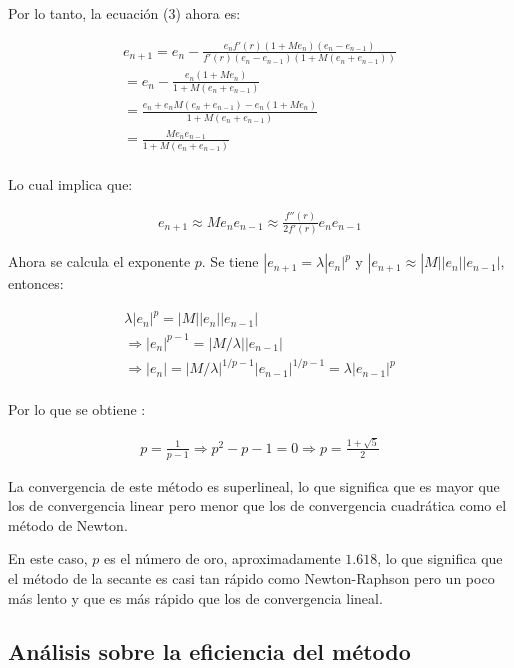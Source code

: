 Por lo tanto, la ecuación (3) ahora es:


\begin{gather*}
    e_{n+1}= e_{n} - \frac{e_nf'(r)(1+Me_n)(e_n -e_{n-1})}{f'(r)(e_n-e_{n-1})(1+M(e_n +e_{n-1}))} \\
    = e_{n} - \frac{e_n(1+Me_n)}{1+M(e_n+e_{n-1})} \\
    = \frac{e_n+e_n M(e_n+e_{n-1})-e_n(1+Me_n)}{1+M(e_n+e_{n-1})} \\
    = \frac{M e_n e_{n-1}}{1+M(e_n+e_{n-1})} \\
\end{gather*}


Lo cual implica que:

\begin{gather*}
    e_{n+1} \approx M e_n e_{n-1} \approx \frac{f''(r)}{2f'(r)} e_n e_{n-1}
\end{gather*}

Ahora se calcula el exponente $p$. Se tiene $|e_{n+1}= \lambda|e_n|^{p}$ y $|e_{n+1} \approx |M||e_n||e_{n-1}|$, entonces:

\begin{gather*}
    \lambda|e_n|^{p}=|M||e_n||e_{n-1}| \\
    \Rightarrow |e_n|^{p-1}=|M/\lambda||e_{n-1}| \\
    \Rightarrow |e_n|=|M/\lambda|^{1/{p-1}}|e_{n-1}|^{1/{p-1}}= \lambda|e_{n-1}|^{p} \\
\end{gather*} 

Por lo que se obtiene \cite{edwards}:

\begin{gather*}
    p=\frac{1}{p-1} \Rightarrow p^{2}-p-1=0 \Rightarrow p = \frac{1+ \sqrt{5}}{2}
\end{gather*} 

La convergencia de este método es superlineal, lo que significa que es mayor que los de convergencia linear pero menor que los de convergencia cuadrática como el método de Newton.

En este caso, $p$ es el número de oro, aproximadamente $1.618$, lo que significa que el método de la secante es casi tan rápido como Newton-Raphson pero un poco más lento y que es más rápido que los de convergencia lineal.

\subsection{Análisis sobre la eficiencia del método}

